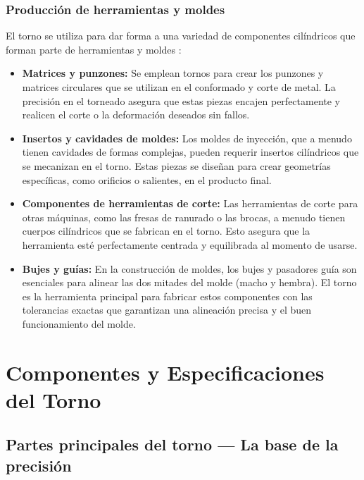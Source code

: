\documentclass[12pt,a4paper]{article}
\begin{document}
\subsubsection{Producción de herramientas y moldes}
El torno se utiliza para dar forma a una variedad de componentes cilíndricos que forman parte de herramientas y moldes \cite{cmz_ingenieria}:
\begin{itemize}[itemsep=2pt, topsep=2pt, parsep=0pt]
    \item \textbf{Matrices y punzones:} Se emplean tornos para crear los punzones y matrices circulares que se utilizan en el conformado y corte de metal. La precisión en el torneado asegura que estas piezas encajen perfectamente y realicen el corte o la deformación deseados sin fallos.
    \item \textbf{Insertos y cavidades de moldes:} Los moldes de inyección, que a menudo tienen cavidades de formas complejas, pueden requerir insertos cilíndricos que se mecanizan en el torno. Estas piezas se diseñan para crear geometrías específicas, como orificios o salientes, en el producto final.
    \item \textbf{Componentes de herramientas de corte:} Las herramientas de corte para otras máquinas, como las fresas de ranurado o las brocas, a menudo tienen cuerpos cilíndricos que se fabrican en el torno. Esto asegura que la herramienta esté perfectamente centrada y equilibrada al momento de usarse.
    \item \textbf{Bujes y guías:} En la construcción de moldes, los bujes y pasadores guía son esenciales para alinear las dos mitades del molde (macho y hembra). El torno es la herramienta principal para fabricar estos componentes con las tolerancias exactas que garantizan una alineación precisa y el buen funcionamiento del molde.
\end{itemize}

\vspace{4pt}
\noindent{\color{utablue!30}\rule{\textwidth}{0.5pt}}
\vspace{2pt}
\section{Componentes y Especificaciones del Torno}
\label{sec:componentes}

\subsection{Partes principales del torno --- La base de la precisión}
\end{document}
